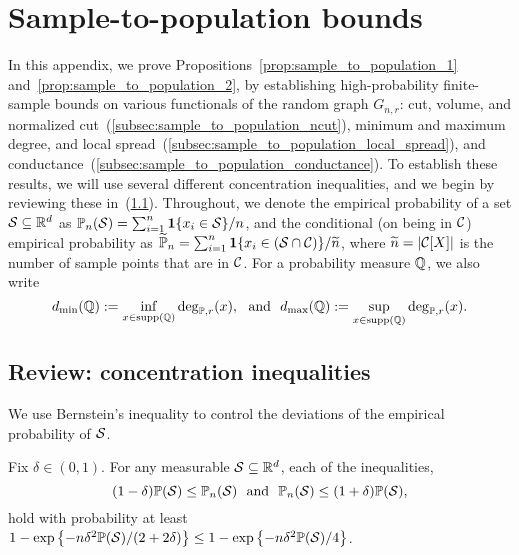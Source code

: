 \section{Sample-to-population bounds}
\label{apdx:sample_to_population}
In this appendix, we prove Propositions~\ref{prop:sample_to_population_1} and~\ref{prop:sample_to_population_2}, by establishing high-probability finite-sample bounds on various functionals of the random graph $G_{n,r}$: cut, volume, and normalized cut~(\ref{subsec:sample_to_population_ncut}), minimum and maximum degree, and local spread~(\ref{subsec:sample_to_population_local_spread}), and conductance~(\ref{subsec:sample_to_population_conductance}). To establish these results, we will use several different concentration inequalities, and we begin by reviewing these in~(\ref{subsec:concentration}). Throughout, we denote the empirical probability of a set $\mathcal{S} \subseteq \mathbb{R}^d$ as $\mathbb{P}_n(\mathcal{S}) = \sum_{i = 1}^{n} \mathbf{1}\{x_i \in \mathcal{S}\}/n$, and the conditional (on being in $\mathcal{C}$) empirical probability as $\widetilde{\mathbb{P}}_n = \sum_{i = 1}^{n} \mathbf{1}\{x_i \in (\mathcal{S} \cap \mathcal{C})\}/\widetilde{n}$, where $\widetilde{n} = |\mathcal{C}[X]|$ is the number of sample points that are in $\mathcal{C}$. For a probability measure $\mathbb{Q}$, we also write
\begin{equation}
\label{eqn:population_minmax_degree}
d_{\min}(\mathbb{Q}) := \inf_{x \in \mathrm{supp}(\mathbb{Q})} \deg_{\mathbb{P},r}(x),~~\textrm{and}~~d_{\max}(\mathbb{Q}) := \sup_{x \in \mathrm{supp}(\mathbb{Q})} \deg_{\mathbb{P},r}(x).
\end{equation}

\subsection{Review: concentration inequalities}
\label{subsec:concentration}
We use Bernstein's inequality to control the deviations of the empirical probability of $\mathcal{S}$.
\begin{lemma}
	\label{lem:hoeffding_2}
	Fix $\delta \in (0,1)$. For any measurable $\mathcal{S} \subseteq \mathbb{R}^d$, each of the inequalities,
	\begin{equation*}
	(1 - \delta) \mathbb{P}(\mathcal{S}) \leq \mathbb{P}_n(\mathcal{S})~~\textrm{and}~~\mathbb{P}_n(\mathcal{S}) \leq (1 + \delta)\mathbb{P}(\mathcal{S}),
	\end{equation*}
	hold with probability at least $1 - \exp\left\{-n\delta^2\mathbb{P}(\mathcal{S})/(2 + 2\delta)\right\} \leq 1 - \exp\left\{-n\delta^2\mathbb{P}(\mathcal{S})/4\right\}$. 
\end{lemma}


